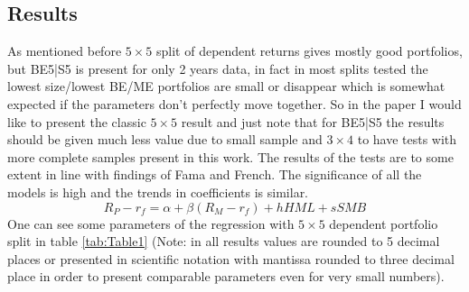 \documentclass[a4paper,12pt]{article} %
\begin{document}
	\subsection{Results}
	As mentioned before $5\times 5$ split of dependent returns gives  mostly good portfolios, but BE5|S5 is present for only 2 years data, in fact in most splits tested the lowest size/lowest BE/ME portfolios are small or disappear which is somewhat expected if the parameters don't perfectly move together. So in the paper I would like to present the classic $5\times5$ result and just note that for BE5|S5 the results should be given much less value due to small sample and $3\times4$ to have tests with more complete samples present in this work.
	The results of the tests are to some extent in line with findings of Fama and French. The significance of all the models is high and the trends in coefficients is similar.
	\[R_P - r_f = \alpha + \beta (R_M - r_f) + hHML + sSMB\]
	One can see some parameters of the regression with $5\times 5$ dependent portfolio split in table \ref{tab:Table1} (Note: in all results values are rounded to 5 decimal places or presented in scientific notation with mantissa rounded to three decimal place in order to present comparable parameters even for very small numbers).
\end{document}
